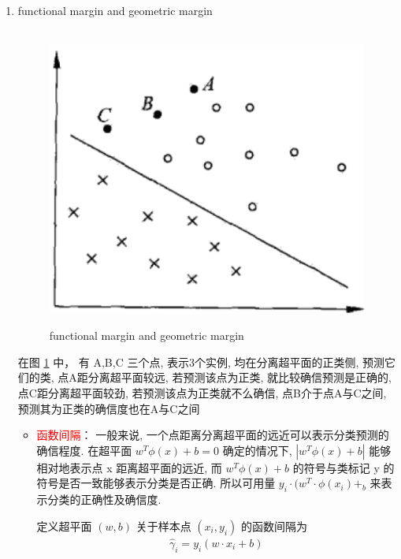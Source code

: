 \documentclass[oneside, 12pt]{ctexbook}
\begin{document}
\begin{enumerate}
					\item functional margin and geometric margin
						\begin{figure}[H]
							\vspace{-0.2cm}  %
							\setlength{\abovecaptionskip}{-0.2cm}   %
							\centering
							\includegraphics[scale=0.6]{functional_and_geometric_margin.png}
							\renewcommand{\figurename}{Fig} %
							\caption{functional margin and geometric margin}
							\label{margin}
						\end{figure}
						\qquad 在图 \ref{margin} 中， 有 A,B,C 三个点, 表示3个实例, 均在分离超平面的正类侧, 预测它们的类, 点A距分离超平面较远, 若预测该点为正类, 就比较确信预测是正确的, 点C距分离超平面较劲, 若预测该点为正类就不么确信, 点B介于点A与C之间, 预测其为正类的确信度也在A与C之间
						\begin{itemize}
							\item \textcolor{red}{函数间隔}： 一般来说, 一个点距离分离超平面的远近可以表示分类预测的确信程度. 在超平面 $w^T \phi(x) + b = 0$ 确定的情况下, $|w^T \phi(x) + b|$ 能够相对地表示点 x 距离超平面的远近, 而 $w^T \phi(x) + b$ 的符号与类标记 y 的符号是否一致能够表示分类是否正确. 所以可用量 $y_i \cdot (w^T \cdot \phi(x_i) +_b$ 来表示分类的正确性及确信度.
						
							定义超平面 $(w, b)$ 关于样本点 $(x_i, y_i)$ 的函数间隔为
								\begin{align}
									\hat{\gamma}_i = y_i (w \cdot x_i + b)
 								\end{align}
						

\end{itemize}
\end{enumerate}
\end{document}
